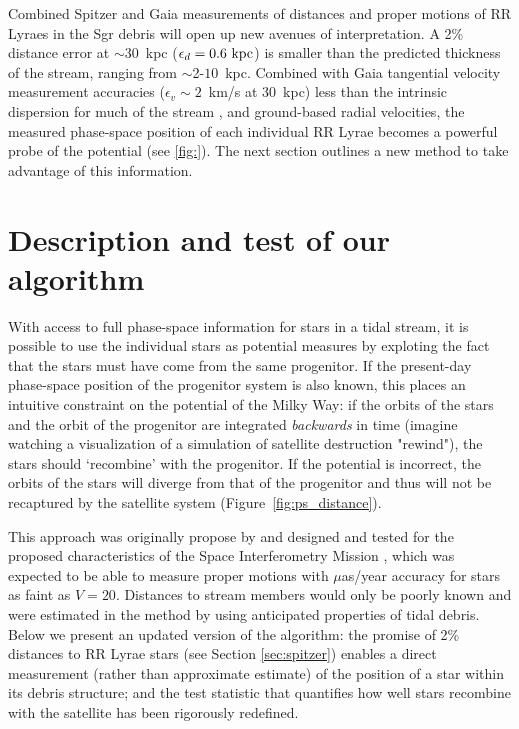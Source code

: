 \documentclass[preprint]{aastex}
\begin{document}
Combined Spitzer and Gaia measurements of distances and proper
motions of RR Lyraes in the Sgr debris will open up new avenues of
interpretation. A 2\% distance error at $\sim$30~kpc ($\epsilon_{d}=0.6~{\rm kpc}$) is smaller than
the predicted thickness of the stream, ranging from
$\sim$2-$10$~kpc. Combined with Gaia tangential velocity measurement
accuracies ($\epsilon_{v}\sim2$~km/s at 30~kpc) less than the intrinsic dispersion
for much of the stream \citep[$\sigma_v\sim10$~km/s;][]{majewski2004}, and ground-based radial
velocities, the measured phase-space
position of each individual RR Lyrae becomes a
powerful probe of the potential (see \ref{fig:}). The next section outlines a new
method to take advantage of this information.

\section{Description and test of our algorithm}
\label{sec:method}
With access to full phase-space information for stars in a tidal
stream, it is possible to use the individual stars as
potential measures by exploting the fact that the stars must have come
from the same progenitor. If the present-day phase-space position of the
progenitor system is also known, this places an intuitive constraint on
the potential of the Milky Way: if the orbits of the stars and the
orbit of the progenitor are integrated \emph{backwards} in time
(imagine watching a visualization of a simulation of satellite destruction "rewind"), the
stars should `recombine' with the progenitor. If the potential is
incorrect, the orbits of the stars will diverge from that of the
progenitor and thus will not be recaptured by the satellite system (Figure~\ref{fig:ps_distance}).

This approach was originally propose by \citep{jzsh1999} and designed and tested for the proposed characteristics of the Space Interferometry Mission \citep{unwin??}, which was expected to be able to measure proper motions with $\mu$as/year accuracy for stars as faint as $V=20$. Distances to stream members would only be poorly known and were estimated in the method by using anticipated properties of tidal debris. Below we present an updated version of the algorithm: the promise of 2\% distances to RR Lyrae stars (see Section \ref{sec:spitzer}) enables a direct measurement (rather than approximate estimate) of the position of a star within its debris structure; and the test statistic that quantifies how well stars recombine with the satellite has been rigorously redefined.
\end{document}

